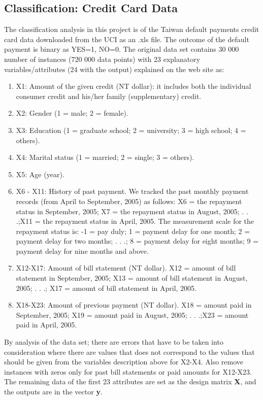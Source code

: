 \documentclass[12pt,a4paper,english]{article}
\begin{document}
\subsection{Classification: Credit Card Data}
\label{subsect:credit_data}
The classification analysis in this project is of the Taiwan default payments credit card data downloaded from the UCI \cite{UCI} as an .xls file. The outcome of the default payment is binary as YES=1, NO=0. The original data set contains 30 000 number of instances (720 000 data points) with 23 explanatory variables/attributes (24 with the output) explained on the web site as:
\begin{enumerate}
	\item X1: Amount of the given credit (NT dollar): it includes both the individual consumer credit and his/her family (supplementary) credit. 
	\item X2: Gender (1 = male; 2 = female). 
	\item X3: Education (1 = graduate school; 2 = university; 3 = high school; 4 = others). 
	\item X4: Marital status (1 = married; 2 = single; 3 = others). 
	\item X5: Age (year). 
	\item X6 - X11: History of past payment. We tracked the past monthly payment records (from April to September, 2005) as follows: X6 = the repayment status in September, 2005; X7 = the repayment status in August, 2005; . . .;X11 = the repayment status in April, 2005. The measurement scale for the repayment status is: -1 = pay duly; 1 = payment delay for one month; 2 = payment delay for two months; . . .; 8 = payment delay for eight months; 9 = payment delay for nine months and above. 
	\item X12-X17: Amount of bill statement (NT dollar). X12 = amount of bill statement in September, 2005; X13 = amount of bill statement in August, 2005; . . .; X17 = amount of bill statement in April, 2005. 
	\item X18-X23: Amount of previous payment (NT dollar). X18 = amount paid in September, 2005; X19 = amount paid in August, 2005; . . .;X23 = amount paid in April, 2005. 
\end{enumerate}
By analysis of the data set; there are errors that have to be taken into consideration where there are values that does not correspond to the values that should be given from the variables description above for X2-X4. Also remove instances with zeros only for past bill statements or paid amounts for X12-X23. The remaining data of the first 23 attributes are set as the design matrix \textbf{X}, and the outputs are in the vector \textbf{y}.
\end{document}
